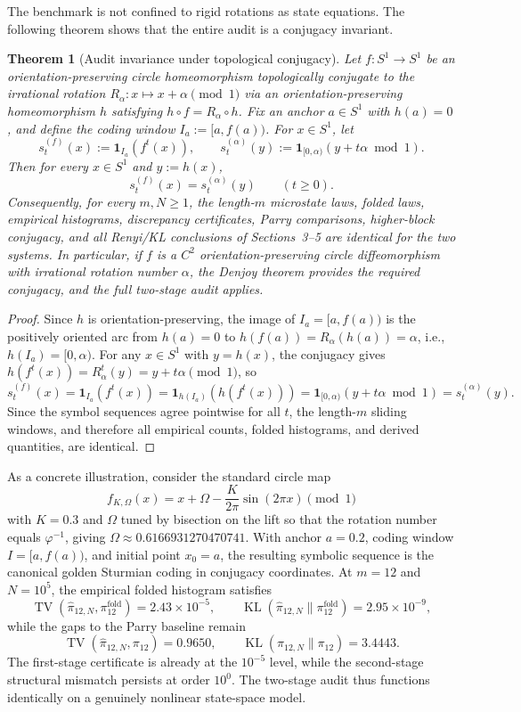 \documentclass[11pt,letterpaper]{article}
\numberwithin{equation}{section}
\theoremstyle{plain}
\newtheorem{theorem}{Theorem}[section]
\theoremstyle{definition}
\theoremstyle{remark}
\DeclareMathOperator{\TV}{TV}
\DeclareMathOperator{\KL}{KL}
\begin{document}
The benchmark is not confined to rigid rotations as state equations. The
following theorem shows that the entire audit is a conjugacy invariant.

\begin{theorem}[Audit invariance under topological conjugacy]
\label{thm:audit-conjugacy-invariance}
Let \(f:S^1\to S^1\) be an orientation-preserving circle homeomorphism
topologically conjugate to the irrational rotation
\(R_\alpha:x\mapsto x+\alpha\pmod 1\) via an orientation-preserving
homeomorphism \(h\) satisfying \(h\circ f=R_\alpha\circ h\). Fix an anchor
\(a\in S^1\) with \(h(a)=0\), and define the coding window
\(I_a:=[a,f(a))\). For \(x\in S^1\), let
\[
s_t^{(f)}(x):=\mathbf{1}_{I_a}(f^t(x)),
\qquad
s_t^{(\alpha)}(y):=\mathbf{1}_{[0,\alpha)}(y+t\alpha\bmod 1).
\]
Then for every \(x\in S^1\) and \(y:=h(x)\),
\[
s_t^{(f)}(x)=s_t^{(\alpha)}(y)
\qquad(t\ge 0).
\]
Consequently, for every \(m,N\ge 1\), the length-\(m\) microstate laws,
folded laws, empirical histograms, discrepancy certificates, Parry
comparisons, higher-block conjugacy, and all Renyi/KL conclusions of
Sections~3--5 are identical for the two systems. In particular, if \(f\)
is a \(C^2\) orientation-preserving circle diffeomorphism with irrational
rotation number \(\alpha\), the Denjoy theorem provides the required
conjugacy, and the full two-stage audit applies.
\end{theorem}

\begin{proof}
Since \(h\) is orientation-preserving, the image of \(I_a=[a,f(a))\) is the
positively oriented arc from \(h(a)=0\) to
\(h(f(a))=R_\alpha(h(a))=\alpha\), i.e., \(h(I_a)=[0,\alpha)\). For any
\(x\in S^1\) with \(y=h(x)\), the conjugacy gives
\(h(f^t(x))=R_\alpha^t(y)=y+t\alpha\pmod 1\), so
\[
s_t^{(f)}(x)
=\mathbf{1}_{I_a}(f^t(x))
=\mathbf{1}_{h(I_a)}(h(f^t(x)))
=\mathbf{1}_{[0,\alpha)}(y+t\alpha\bmod 1)
=s_t^{(\alpha)}(y).
\]
Since the symbol sequences agree pointwise for all \(t\), the length-\(m\)
sliding windows, and therefore all empirical counts, folded histograms, and
derived quantities, are identical.
\end{proof}

As a concrete illustration, consider the standard circle map
\[
f_{K,\Omega}(x)=x+\Omega-\frac{K}{2\pi}\sin(2\pi x)\pmod 1
\]
with \(K=0.3\) and \(\Omega\) tuned by bisection on the lift so that the
rotation number equals \(\varphi^{-1}\), giving
\(\Omega\approx 0.6166931270470741\). With anchor \(a=0.2\), coding window
\(I=[a,f(a))\), and initial point \(x_0=a\), the resulting symbolic sequence
is the canonical golden Sturmian coding in conjugacy coordinates.
At \(m=12\) and \(N=10^5\), the empirical folded histogram satisfies
\[
\TV(\hat\pi_{12,N},\pi_{12}^{\mathrm{fold}})
=2.43\times 10^{-5},
\qquad
\KL(\hat\pi_{12,N}\|\pi_{12}^{\mathrm{fold}})
=2.95\times 10^{-9},
\]
while the gaps to the Parry baseline remain
\[
\TV(\hat\pi_{12,N},\pi_{12})=0.9650,
\qquad
\KL(\hat\pi_{12,N}\|\pi_{12})=3.4443.
\]
The first-stage certificate is already at the \(10^{-5}\) level, while the
second-stage structural mismatch persists at order \(10^0\). The two-stage
audit thus functions identically on a genuinely nonlinear state-space model.
\end{document}

